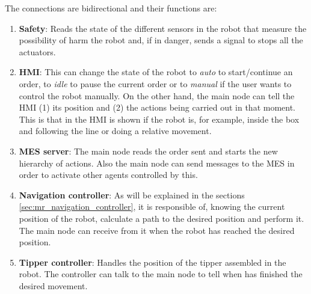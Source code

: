 The connections are bidirectional and their functions are:
\begin{enumerate}
	\item \textbf{Safety}: Reads the state of the different sensors in the robot that measure the possibility of harm the robot and, if in danger, sends a signal to stops all the actuators.  
	\item \textbf{HMI}: This can change the state of the robot to \emph{auto} to start/continue an order, to \emph{idle} to pause the current order or to \emph{manual} if the user wants to control the robot manually. On the other hand, the main node can tell the HMI (1) its position and (2) the actions being carried out in that moment. This is that in the HMI is shown if the robot is, for example, inside the box and following the line or doing a relative movement.
	\item \textbf{MES server}: The main node reads the order sent and starts the new hierarchy of actions. Also the main node can send messages to the MES in order to activate other agents controlled by this.
	\item \textbf{Navigation controller}: As will be explained in the sections \ref{sec:mr_navigation_controller}, it is responsible of, knowing the current position of the robot, calculate a path to the desired position and perform it. The main node can receive from it when the robot has reached the desired position.
	\item \textbf{Tipper controller}: Handles the position of the tipper assembled in the robot. The controller can talk to the main node to tell when has finished the desired movement.
\end{enumerate}


